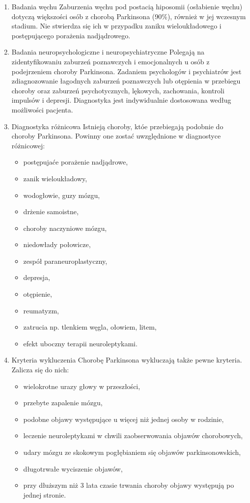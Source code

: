 \begin{enumerate}
	\item Badania węchu
Zaburzenia węchu pod postacią hiposomii (osłabienie węchu) dotyczą większości osób z chorobą Parkinsona (90\%), również w jej wczesnym stadium.
Nie stwierdza się ich w przypadku zaniku wieloukładowego i postępującego porażenia nadjądrowego.

	\item Badania neuropsychologiczne i neuropsychiatryczne
Polegają na zidentyfikowaniu zaburzeń poznawczych i emocjonalnych u osób z podejrzeniem choroby Parkinsona.
Zadaniem psychologów i psychiatrów jest zdiagnozowanie łagodnych zaburzeń poznawczych lub otępienia w przebiegu choroby oraz
zaburzeń psychotycznych, lękowych, zachowania, kontroli impulsów i depresji.
Diagnostyka jest indywidualnie dostosowana według możliwości pacjenta.

	\item Diagnostyka różnicowa
Istnieją choroby, któe przebiegają podobnie do choroby Parkinsona.
Powinny one zostać uwzględnione w diagnostyce różnicowej:
\begin{itemize}[itemsep=0.5pt]
	\item postępujaće porażenie nadjądrowe,
	\item zanik wieloukładowy,
	\item wodogłowie, guzy mózgu,
	\item drżenie samoistne,
	\item choroby naczyniowe mózgu,
	\item niedowłady połowicze,
	\item zespół paraneuroplastyczny,
	\item depresja,
	\item otępienie,
	\item reumatyzm,
	\item zatrucia np. tlenkiem węgla, ołowiem, litem,
	\item efekt uboczny terapii neuroleptykami.
\end{itemize}


	\item Kryteria wykluczenia
Chorobę Parkinsona wykluczają także pewne kryteria. Zalicza się do nich:
\begin{itemize}[itemsep=0.5pt]
	\item wielokrotne urazy głowy w przeszłości,
	\item przebyte zapalenie mózgu,
	\item podobne objawy występujące u więcej niż jednej osoby w rodzinie,
	\item leczenie neuroleptykami w chwili zaobserwowania objawów chorobowych,
	\item udary mózgu ze skokowym pogłębianiem się objawów parkinsonowskich,
	\item długotrwałe wyciszenie objawów,
	\item przy dłuższym niż 3 lata czasie trwania choroby objawy występują po jednej stronie.
\end{itemize}

\end{enumerate}
